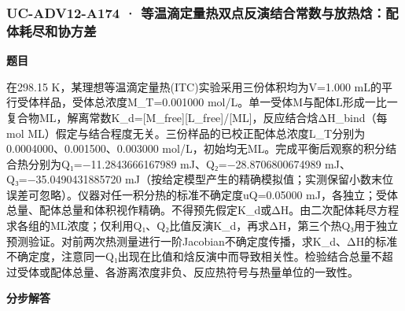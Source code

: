 \documentclass[UTF8,11pt,a4paper]{ctexart}
\begin{document}
\subsubsection*{UC-ADV12-A174 · 等温滴定量热双点反演结合常数与放热焓：配体耗尽和协方差}
\noindent\textbf{题目}\par
在298.15 K，某理想等温滴定量热(ITC)实验采用三份体积均为V=1.000 mL的平行受体样品，受体总浓度M\_T=0.001000 mol/L。单一受体M与配体L形成一比一复合物ML，解离常数K\_d=[M\_free][L\_free]/[ML]，反应结合焓ΔH\_bind（每mol ML）假定与结合程度无关。三份样品的已校正配体总浓度L\_T分别为0.0004000、0.001500、0.003000 mol/L，初始均无ML。完成平衡后观察的积分结合热分别为Q₁=−11.2843666167989 mJ、Q₂=−28.8706800674989 mJ、Q₃=−35.0490431885720 mJ（按给定模型产生的精确模拟值；实测保留小数末位误差可忽略）。仪器对任一积分热的标准不确定度uQ=0.05000 mJ，各独立；受体总量、配体总量和体积视作精确。不得预先假定K\_d或ΔH。由二次配体耗尽方程求各组的ML浓度；仅利用Q₁、Q₂比值反演K\_d，再求ΔH，第三个热Q₃用于独立预测验证。对前两次热测量进行一阶Jacobian不确定度传播，求K\_d、ΔH的标准不确定度，注意同一Q₁出现在比值和焓反演中而导致相关性。检验结合总量不超过受体或配体总量、各游离浓度非负、反应热符号与热量单位的一致性。\par
\medskip\noindent\textbf{分步解答}
\end{document}
